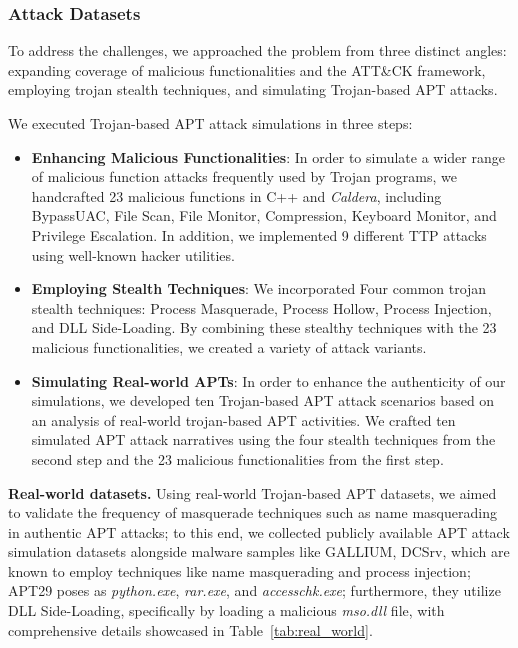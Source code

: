 \subsubsection{Attack Datasets}

To address the challenges, we approached the problem from three distinct angles: expanding coverage of malicious functionalities and the ATT\&CK framework, employing trojan stealth techniques, and simulating Trojan-based APT attacks.

We executed Trojan-based APT attack simulations in three steps:
\begin{itemize}
    \item \textbf{Enhancing Malicious Functionalities}: In order to simulate a wider range of malicious function attacks frequently used by Trojan programs, we handcrafted 23 malicious functions in C++ and \textit{Caldera}\cite{caldera}, including BypassUAC, File Scan, File Monitor, Compression, Keyboard Monitor, and Privilege Escalation. In addition, we implemented 9 different TTP attacks using well-known hacker utilities. 
    \item \textbf{Employing Stealth Techniques}: We incorporated Four common trojan stealth techniques: Process Masquerade, Process Hollow, Process Injection, and DLL Side-Loading. By combining these stealthy techniques with the 23 malicious functionalities, we created a variety of attack variants. 
    \item \textbf{Simulating Real-world APTs}: In order to enhance the authenticity of our simulations, we developed ten Trojan-based APT attack scenarios based on an analysis of real-world trojan-based APT activities. We crafted ten simulated APT attack narratives using the four stealth techniques from the second step and the 23 malicious functionalities from the first step.
\end{itemize}


\noindent
{\bf Real-world datasets.} Using real-world Trojan-based APT datasets, we aimed to validate the frequency of masquerade techniques such as name masquerading in authentic APT attacks; to this end, we collected publicly available APT attack simulation datasets alongside malware samples like GALLIUM\cite{cybereason2023}, DCSrv\cite{checkpoint2021},  which are known to employ techniques like name masquerading and process injection;  APT29 poses as \textit{python.exe}, \textit{rar.exe}, and \textit{accesschk.exe}; furthermore, they utilize DLL Side-Loading, specifically by loading a malicious \textit{mso.dll} file, with comprehensive details showcased in Table~\ref{tab:real_world}.

